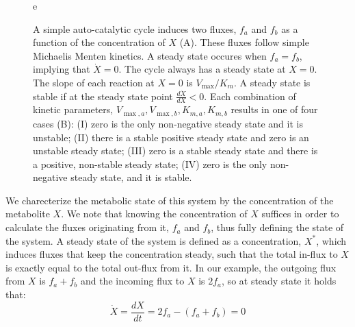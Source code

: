 \documentclass[a4page,notitlepage]{article}
\begin{document}
\begin{figure}[h!]
\begin{minipage}[c]{.65\linewidth}
{}
       \end{minipage}
      e\caption{\label{fig:simplecycle}
       A simple auto-catalytic cycle induces two fluxes, $f_a$ and $f_b$ as a function of the concentration of $X$ (A).
        These fluxes follow simple Michaelis Menten kinetics.
        A steady state occures when $f_a=f_b$, implying that $\dot{X}=0$.
        The cycle always has a steady state at $X=0$.
        The slope of each reaction at $X=0$ is $V_{\max}/K_m$.
        A steady state is stable if at the steady state point $\frac{d\dot{X}}{dX}<0$.
        Each combination of kinetic parameters, $V_{\max,a},V_{\max,b},K_{m,a},K_{m,b}$ results in one of four cases (B): 
       (I) zero is the only non-negative steady state and it is unstable; 
       (II) there is a stable positive steady state and zero is an unstable steady state; 
       (III) zero is a stable steady state and there is a positive, non-stable steady state; 
       (IV) zero is the only non-negative steady state, and it is stable.}
    \end{figure}

    We charecterize the metabolic state of this system by the concentration of the metabolite $X$.
    We note that knowing the concentration of $X$ suffices in order to calculate the fluxes originating from it, $f_a$ and $f_b$, thus fully defining the state of the system.
    A steady state of the system is defined as a concentration, $X^*$, which induces fluxes that keep the concentration steady, such that the total in-flux to $X$ is exactly equal to the total out-flux from it.
    In our example, the outgoing flux from $X$ is $f_a+f_b$ and the incoming flux to $X$ is $2f_a$, so at steady state it holds that:
    \begin{equation*}
      \dot X = \frac{dX}{dt} = 2f_a - (f_a + f_b) = 0
    \end{equation*}
\end{document}
